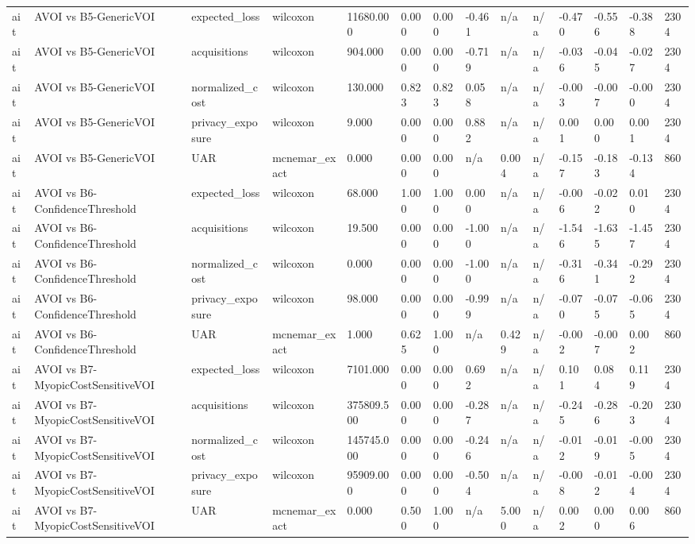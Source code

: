 \begin{table}[!ht]
{\begin{tabular}{llllllllllllll}
ait & AVOI vs B5-GenericVOI & expected\_loss & wilcoxon & 11680.000 & 0.000 & 0.000 & -0.461 & n/a & n/a & -0.470 & -0.556 & -0.388 & 2304 \\
ait & AVOI vs B5-GenericVOI & acquisitions & wilcoxon & 904.000 & 0.000 & 0.000 & -0.719 & n/a & n/a & -0.036 & -0.045 & -0.027 & 2304 \\
ait & AVOI vs B5-GenericVOI & normalized\_cost & wilcoxon & 130.000 & 0.823 & 0.823 & 0.058 & n/a & n/a & -0.003 & -0.007 & -0.000 & 2304 \\
ait & AVOI vs B5-GenericVOI & privacy\_exposure & wilcoxon & 9.000 & 0.000 & 0.000 & 0.882 & n/a & n/a & 0.001 & 0.000 & 0.001 & 2304 \\
ait & AVOI vs B5-GenericVOI & UAR & mcnemar\_exact & 0.000 & 0.000 & 0.000 & n/a & 0.004 & n/a & -0.157 & -0.183 & -0.134 & 860 \\
ait & AVOI vs B6-ConfidenceThreshold & expected\_loss & wilcoxon & 68.000 & 1.000 & 1.000 & 0.000 & n/a & n/a & -0.006 & -0.022 & 0.010 & 2304 \\
ait & AVOI vs B6-ConfidenceThreshold & acquisitions & wilcoxon & 19.500 & 0.000 & 0.000 & -1.000 & n/a & n/a & -1.546 & -1.635 & -1.457 & 2304 \\
ait & AVOI vs B6-ConfidenceThreshold & normalized\_cost & wilcoxon & 0.000 & 0.000 & 0.000 & -1.000 & n/a & n/a & -0.316 & -0.341 & -0.292 & 2304 \\
ait & AVOI vs B6-ConfidenceThreshold & privacy\_exposure & wilcoxon & 98.000 & 0.000 & 0.000 & -0.999 & n/a & n/a & -0.070 & -0.075 & -0.065 & 2304 \\
ait & AVOI vs B6-ConfidenceThreshold & UAR & mcnemar\_exact & 1.000 & 0.625 & 1.000 & n/a & 0.429 & n/a & -0.002 & -0.007 & 0.002 & 860 \\
ait & AVOI vs B7-MyopicCostSensitiveVOI & expected\_loss & wilcoxon & 7101.000 & 0.000 & 0.000 & 0.692 & n/a & n/a & 0.101 & 0.084 & 0.119 & 2304 \\
ait & AVOI vs B7-MyopicCostSensitiveVOI & acquisitions & wilcoxon & 375809.500 & 0.000 & 0.000 & -0.287 & n/a & n/a & -0.245 & -0.286 & -0.203 & 2304 \\
ait & AVOI vs B7-MyopicCostSensitiveVOI & normalized\_cost & wilcoxon & 145745.000 & 0.000 & 0.000 & -0.246 & n/a & n/a & -0.012 & -0.019 & -0.005 & 2304 \\
ait & AVOI vs B7-MyopicCostSensitiveVOI & privacy\_exposure & wilcoxon & 95909.000 & 0.000 & 0.000 & -0.504 & n/a & n/a & -0.008 & -0.012 & -0.004 & 2304 \\
ait & AVOI vs B7-MyopicCostSensitiveVOI & UAR & mcnemar\_exact & 0.000 & 0.500 & 1.000 & n/a & 5.000 & n/a & 0.002 & 0.000 & 0.006 & 860 \\

\end{tabular}}
\end{table}
